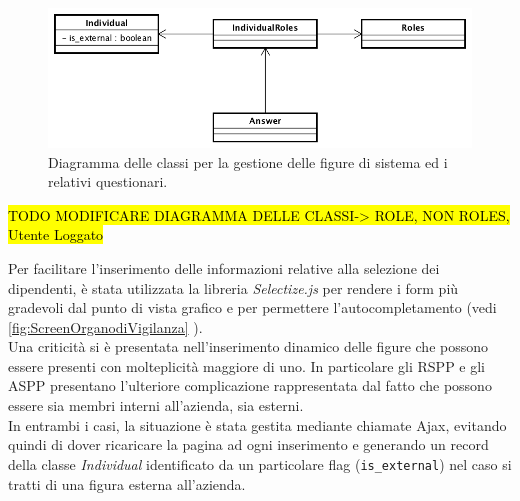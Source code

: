 		\begin{figure}[H]
			\begin{center}
				\includegraphics[width=14cm]{Pics/UMLClassiFigureDiSistema.png}
				\caption{
					Diagramma delle classi per la gestione delle figure di sistema ed i relativi questionari.}
				\label{fig:DiagrammaDelleClassiIndividualRoles}
			\end{center}
		\end{figure}
	
	\hl{TODO MODIFICARE DIAGRAMMA DELLE CLASSI-> ROLE, NON ROLES, Utente Loggato}
	
	Per facilitare l'inserimento delle informazioni relative alla selezione dei dipendenti, è stata utilizzata la libreria \textit{Selectize.js} per rendere i form più gradevoli dal punto di vista grafico e per permettere l'autocompletamento (vedi \autoref{fig:ScreenOrganodiVigilanza} ). \\ 
	Una criticità si è presentata nell'inserimento dinamico delle figure che possono essere presenti con molteplicità maggiore di uno. In particolare gli RSPP e gli ASPP presentano l'ulteriore complicazione rappresentata dal fatto che possono essere sia membri interni all'azienda, sia esterni. \\
	In entrambi i casi, la situazione è stata gestita mediante chiamate \gls{Ajax}, evitando quindi di dover ricaricare la pagina ad ogni inserimento e generando un record della classe \textit{Individual}  identificato da un particolare flag (\texttt{is\_external}) nel caso si tratti di una figura esterna all'azienda.\\
	
